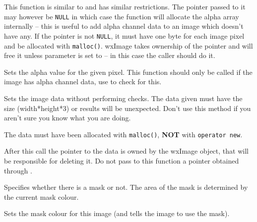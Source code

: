 This function is similar to  and has similar
restrictions. The pointer passed to it may however be {\tt NULL} in which case
the function will allocate the alpha array internally -- this is useful to add
alpha channel data to an image which doesn't have any. If the pointer is not
{\tt NULL}, it must have one byte for each image pixel and be allocated with
{\tt malloc()}. wxImage takes ownership of the pointer and will free it unless
 parameter is set to \true -- in this case the caller should
do it.


Sets the alpha value for the given pixel. This function should only be called
if the image has alpha channel data, use  to
check for this.


\label{wximagesetdata}


Sets the image data without performing checks. The data given must have
the size (width*height*3) or results will be unexpected. Don't use this
method if you aren't sure you know what you are doing.

The data must have been allocated with {\tt malloc()}, {\large {\bf NOT}} with
{\tt operator new}.

After this call the pointer to the data is owned by the wxImage object,
that will be responsible for deleting it.
Do not pass to this function a pointer obtained through
.


\label{wximagesetmask}


Specifies whether there is a mask or not. The area of the mask is determined by the current mask colour.


\label{wximagesetmaskcolour}


Sets the mask colour for this image (and tells the image to use the mask).


\label{wximagesetmaskfromimage}


